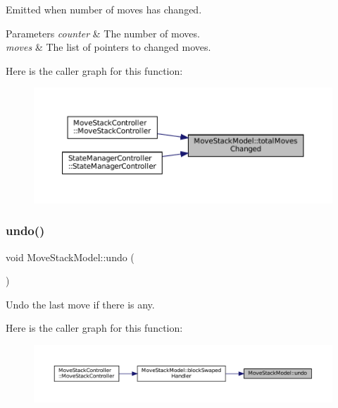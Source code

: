 Emitted when number of moves has changed. 


\begin{DoxyParams}{Parameters}
{\em counter} & The number of moves. \\
\hline
{\em moves} & The list of pointers to changed moves. \\
\hline
\end{DoxyParams}
Here is the caller graph for this function\+:
\nopagebreak
\begin{figure}[H]
\begin{center}
\leavevmode
\includegraphics[width=350pt]{class_move_stack_model_a8b596d9619735fc7d066a3d0e1b8cc55_icgraph}
\end{center}
\end{figure}
\mbox{\label{class_move_stack_model_a10ab990b00c1eb0d543d75b8b07eb4bf}} 
\subsubsection{\texorpdfstring{undo()}{undo()}}
{\footnotesize\ttfamily void Move\+Stack\+Model\+::undo (\begin{DoxyParamCaption}{ }\end{DoxyParamCaption})}



Undo the last move if there is any. 

Here is the caller graph for this function\+:
\nopagebreak
\begin{figure}[H]
\begin{center}
\leavevmode
\includegraphics[width=350pt]{class_move_stack_model_a10ab990b00c1eb0d543d75b8b07eb4bf_icgraph}
\end{center}
\end{figure}
\mbox{\label{class_move_stack_model_a16436cf5acda5455355c24f28586f1e8}} 
